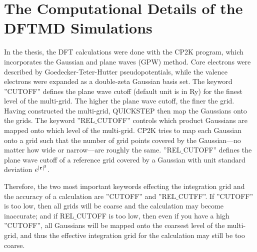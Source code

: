 \section{The Computational Details of the DFTMD Simulations}\label{computational_detail}
In the thesis, the DFT calculations were done with the CP2K program, which incorporates the Gaussian and plane waves (GPW) method\cite{GL99}. 
Core electrons were described by Goedecker-Teter-Hutter pseudopotentials\cite{MK05}, while the valence electrons were expanded as a double-zeta Gaussian basis set.
The keyword ''CUTOFF'' defines the plane wave cutoff (default unit is in Ry) for the finest level of the multi-grid. 
The higher the plane wave cutoff, the finer the grid.
Having constructed the multi-grid, QUICKSTEP then map the Gaussians onto the grids. The keyword ''REL$\_$CUTOFF'' controls which product Gaussians 
are mapped onto which level of the multi-grid. CP2K tries to map each Gaussian onto a grid such that the number of grid points 
covered by the Gaussian---no matter how wide or narrow---are roughly the same. ''REL$\_$CUTOFF'' defines the plane wave cutoff of a reference grid 
covered by a Gaussian with unit standard deviation $e^{|{\bf r}|^2}$.\cite{CP2K}

Therefore, the two most important keywords effecting the integration grid and the accuracy of a calculation are ''CUTOFF'' and ''REL$\_$CUTFF''.
If ''CUTOFF'' is too low, then all grids will be coarse and the calculation may become inaccurate; and if REL$\_$CUTOFF is too low, then even if you have a high ''CUTOFF'', 
all Gaussians will be mapped onto the coarsest level of the multi-grid, and thus the effective integration grid for the calculation may still be too coarse.

